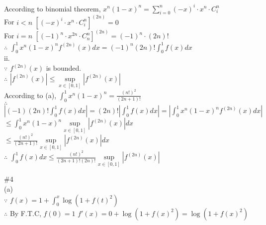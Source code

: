 \documentclass{article}
\begin{document}
According to binomial theorem, $\displaystyle x^n (1-x)^n = \sum \limits_{i = 0}^n (-x)^i \cdot x^n \cdot C_i^n$\\

For $i < n$ \quad $\left[(-x)^i \cdot x^n \cdot C_i^n \right]^{(2n)} = 0$\\

For $i = n$ \quad $\left[(-1)^n \cdot x^{2n} \cdot C_n^n\right]^{(2n)} = (-1)^n \cdot (2n)!$\\

$\therefore$ \qquad $\displaystyle \int_0^1 x^n (1-x)^nf^{(2n)}(x) dx = (-1)^n(2n)! \int_0^1 f(x) dx$\\

ii.\\

$\because$ \qquad $f^{(2n)}(x)$ is bounded.\\

$\therefore$ \qquad $\displaystyle \left|f^{(2n)}(x)\right| \leq \sup \limits_{x \in [0,1]} \left|f^{(2n)}(x)\right|$\\

According to (a), $\displaystyle \int_0^1 x^n (1-x)^n =  \frac{(n!)^2}{(2n+1)!}$\\

$\therefore$ \qquad $\displaystyle \left|(-1)(2n)! \int_0^1 f(x) dx\right| = (2n)! \left|\int_0^1 f(x) dx\right| = \left|\int_0^1 x^n (1-x)^n f^{(2n)}(x) dx\right|$\\

\hskip 4.59cm $\displaystyle \leq \int_0^1 x^n (1-x)^n \sup \limits_{x \in [0,1]} \left|f^{(2n)}(x)\right|dx$\\

\hskip 4.59cm $\displaystyle \leq \frac{(n!)^2}{(2n+1)!} \sup \limits_{x \in [0,1]} \left|f^{(2n)}(x)\right|dx$\\

$\therefore$ \qquad $\displaystyle \int_0^1 f(x) dx \leq \frac{(n!)^2}{(2n+1)!(2n)!} \sup \limits_{x \in [0,1]} \left|f^{(2n)}(x)\right|$

\vskip 2cm

\textcolor[rgb]{0.00,0.00,0.50}{\#4}\\

(a)\\

$\because$ \qquad $\displaystyle f(x) = 1 + \int_0^x \log{(1 + f(t)^2)}$\\

$\therefore$ \qquad By F.T.C, \quad $\displaystyle f(0) = 1$ \quad $f'(x) = 0 + \log{(1 + f(x)^2)} = \log{(1 + f(x)^2)}$\\
\end{document}
